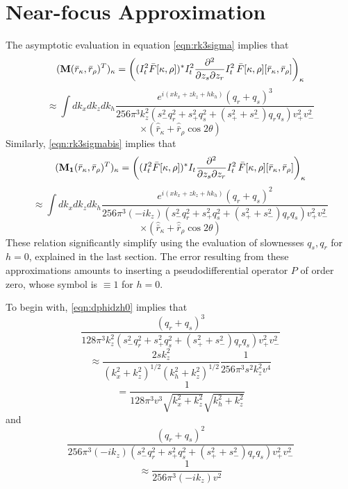 \section{Near-focus Approximation}
The asymptotic evaluation in equation \ref{eqn:rk3sigma} implies that
\[
({\bf M}(\bar{r}_{\kappa},\bar{r}_{\rho})^T)_{\kappa} = \left((I_t^2\bar{F}[\kappa,\rho])^{*}
I_t^2\frac{\partial^2}{\partial z_s \partial z_r}I_t^2\,
\bar{F}[\kappa,\rho][\bar{r}_{\kappa},\bar{r}_{\rho}]\right)_{\kappa}
\]
\[
 \approx \int dk_x dk_z dk_h \frac{e^{i(xk_{x}+zk_{z}+hk_{h})}(q_r+q_s)^3}{256\pi^3 
  k^2_z(s_-^2q_r^2 + s_+^2q_s^2 +
(s_+^2+s_-^2)q_rq_s)v^2_+v^2_-} 
\]
\begin{equation}
\label{eqn:rk3mig}
\times 
(\hat{\bar{r}}_{\kappa} + \hat{\bar{r}}_{\rho} \cos 2 \theta)
\end{equation}
Similarly, \ref{eqn:rk3sigmabis} implies that
\[
({\bf M_1}(\bar{r}_{\kappa},\bar{r}_{\rho})^T)_{\kappa} = \left((I_t^2\bar{F}[\kappa,\rho])^{*}
I_t\frac{\partial^2}{\partial z_s \partial z_r}I_t^2\,
\bar{F}[\kappa,\rho][\bar{r}_{\kappa},\bar{r}_{\rho}]\right)_{\kappa}
\]
\[
 \approx \int dk_x dk_z dk_h \frac{e^{i(xk_{x}+zk_{z}+hk_{h})}(q_r+q_s)^2}{256\pi^3 
  (-ik_z)(s_-^2q_r^2 + s_+^2q_s^2 +
(s_+^2+s_-^2)q_rq_s)v^2_+v^2_-} 
\]
\begin{equation}
\label{eqn:rk3migbis}
\times 
(\hat{\bar{r}}_{\kappa} + \hat{\bar{r}}_{\rho} \cos 2 \theta)
\end{equation}
These relation
significantly simplify using the evaluation of slownesses $q_s,q_r$ for $h=0$,
explained in the last section. The error resulting from these
approximations amounts to inserting a 
pseudodifferential operator $P$ of order zero, whose symbol is $\equiv
1$ for $h=0$.
  
To begin with, \ref{eqn:dphidzh0} implies that
\[
\frac{(q_r+q_s)^3}{128\pi^3 
  k^2_z(s_-^2q_r^2 + s_+^2q_s^2 +
(s_+^2+s_-^2)q_rq_s)v^2_+v^2_-} 
\]
\[
\approx  
\frac{2sk_z^2}{(k_x^2+k_z^2)^{1/2}(k_h^2+k_z^2)^{1/2}}\frac{1}{256  
  \pi^3 s^2k_z^2v^4}
\] 
\begin{equation}
=\frac{1}{128\pi^3 v^3 \sqrt{k_x^2+k_z^2}\sqrt{k_h^2+k_z^2}}
\label{eqn:kksymbh0}
\end{equation} 
and 
\[
\frac{(q_r+q_s)^2}{256\pi^3 
  (-ik_z)(s_-^2q_r^2 + s_+^2q_s^2 +
(s_+^2+s_-^2)q_rq_s)v^2_+v^2_-} 
\]
\begin{equation}
\label{eqn:kksymbh0bis}
\approx 
\frac{1}{256 \pi^3 (-ik_z)v^2}
\end{equation}



